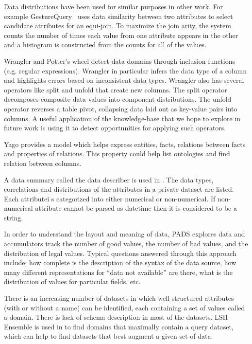 Data distributions have been used for similar purposes in other work.  
For example GestureQuery~\cite{nandi2013gestural} uses data similarity between two attributes to select candidate attributes for an equi-join.  
To maximize the join arity, the system counts the number of times each value from one attribute appears in the other and a histogram is constructed from the counts for all of the values.

Wrangler \cite{kandel2011wrangler} and Potter's wheel \cite{raman2001potter} detect data domains through inclusion functions (e.g. regular expressions).
Wrangler in particular infers the data type of a column and highlights errors based on inconsistent data types. 
Wrangler also has several operators like split and unfold that create new columns.
The split operator decomposes composite data values into component distributions.  
The unfold operator reverses a table pivot, collapsing data laid out as key-value pairs into columns.  
A useful application of the \systemname knowledge-base that we hope to explore in future work is using it to detect opportunities for applying such operators.






Yago \cite{fabian2007yago} provides a model which helps express entities, facts, relations between facts and properties of relations. This property could help list ontologies and find relation between columns.

A data summary called the data describer is used in \cite{ping2017datasynthesizer}. The data types, correlations and distributions of the attributes in a private dataset are listed. Each attributei s categorized into either numerical or non-numerical. If non-numerical attribute cannot be parsed as datetime then it is considered to be a string. 

In order to understand the layout and meaning of data, PADS \cite{fisher2005pads} explores data and accumulators track
the number of good values, the number of bad values, and the distribution
of legal values. Typical questions answered through this approach include: how complete is the description of the syntax of the data source, how many different representations for “data not available” are there, what is the distribution of values for particular fields, etc.


There is an increasing number of datasets in which well-structured attributes
(with or without a name) can be identified, each containing a set of values called a domain. There is lack of schema description in most of the datasets.
LSH Ensemble is used in \cite{zhu2016lsh} to find domains that maximally contain a query dataset, which can help to find datasets that best augment a given set of data.